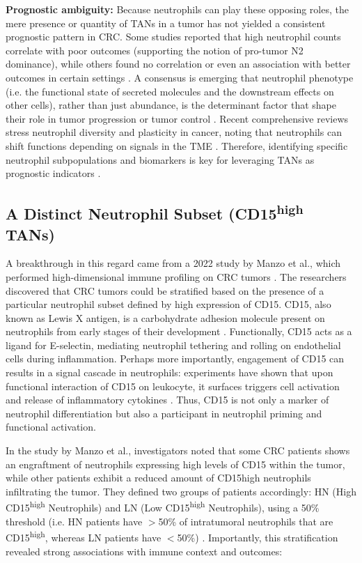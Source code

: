 \textbf{Prognostic ambiguity:} Because neutrophils can play these opposing roles, the mere presence or quantity of TANs in a tumor has not yielded a consistent prognostic pattern in CRC. Some studies reported that high neutrophil counts correlate with poor outcomes (supporting the notion of pro-tumor N2 dominance), while others found no correlation or even an association with better outcomes in certain settings \cite{manzo2022}. A consensus is emerging that neutrophil phenotype (i.e. the functional state of secreted molecules and the downstream effects on other cells), rather than just abundance, is the determinant factor that shape their role in tumor progression or tumor control \cite{que2022neutrophiltherapies,wu2024tans}. Recent comprehensive reviews stress neutrophil diversity and plasticity in cancer, noting that neutrophils can shift functions depending on signals in the TME \cite{manzo2022}. Therefore, identifying specific neutrophil subpopulations and biomarkers is key for leveraging TANs as prognostic indicators \cite{manzo2022}.

\subsection{A Distinct Neutrophil Subset (CD15\textsuperscript{high} TANs)}
\label{sec:IEO}

A breakthrough in this regard came from a 2022 study by Manzo et al., which performed high-dimensional immune profiling on CRC tumors \cite{manzo2022}. The researchers discovered that CRC tumors could be stratified based on the presence of a particular neutrophil subset defined by high expression of CD15. CD15, also known as Lewis X antigen, is a carbohydrate adhesion molecule present on neutrophils from early stages of their development \cite{nomenclature}. Functionally, CD15 acts as a ligand for E-selectin, mediating neutrophil tethering and rolling on endothelial cells during inflammation. Perhaps more importantly, engagement of CD15 can results in a signal cascade in neutrophils: experiments have shown that upon functional interaction of CD15 on leukocyte, it surfaces triggers cell activation and release of inflammatory cytokines \cite{lo1997}. Thus, CD15 is not only a marker of neutrophil differentiation but also a participant in neutrophil priming and functional activation.

In the study by Manzo et al., investigators noted that some CRC patients shows an engraftment of neutrophils expressing high levels of CD15 within the tumor, while other patients exhibit a reduced amount of CD15high neutrophils infiltrating the tumor. They defined two groups of patients accordingly: HN (High CD15\textsuperscript{high} Neutrophils) and LN (Low CD15\textsuperscript{high} Neutrophils), using a 50\% threshold (i.e. HN patients have $>$50\% of intratumoral neutrophils that are CD15\textsuperscript{high}, whereas LN patients have $<$50\%) \cite{manzo2022}. Importantly, this stratification revealed strong associations with immune context and outcomes:

